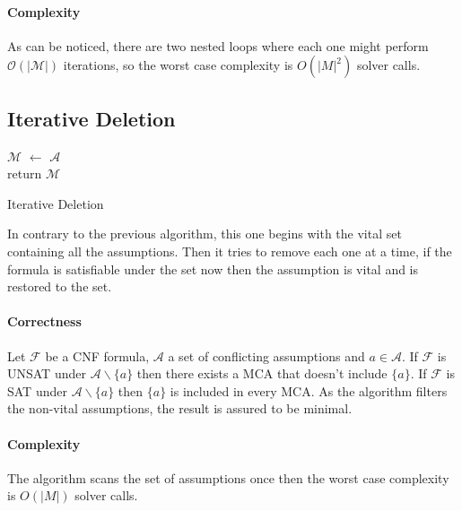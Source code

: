 \documentclass[]{article}
\begin{document}
	\paragraph{Complexity} As can be noticed, there are two nested loops where each one might perform $ \mathcal{O \left( | M |\right) } $ iterations, so the worst case complexity is $ O \left( | M |^\text{2} \right) $ solver calls.
	
	
	\subsection{Iterative Deletion}
		\begin{algorithm}[H]
			$ \mathcal{M} $ $\leftarrow$ $ \mathcal{A} $\\
			return $ \mathcal{M} $
			\caption{Iterative Deletion}
		\end{algorithm}
		In contrary to the previous algorithm, this one begins with the vital set containing all the assumptions. Then it tries to remove each one at a time, if the formula is satisfiable under the set now then the assumption is vital and is restored to the set.
		
		\paragraph{Correctness} Let $ \mathcal{F} $ be a CNF formula, $ \mathcal{A} $ a set of conflicting assumptions and $  a \in \mathcal{A} $. If $ \mathcal{F} $ is UNSAT under $ \mathcal{A} \backslash \{a\} $ then there exists a MCA that doesn't include $ \{a\} $. If $ \mathcal{F} $ is SAT under $ \mathcal{A} \backslash \{a\} $ then $ \{a\} $ is included in every MCA. As the algorithm filters the non-vital assumptions, the result is assured to be minimal.
		
		\paragraph{Complexity} The algorithm scans the set of assumptions once then the worst case complexity is $ O \left( | M | \right)  $ solver calls.
		
\end{document}
